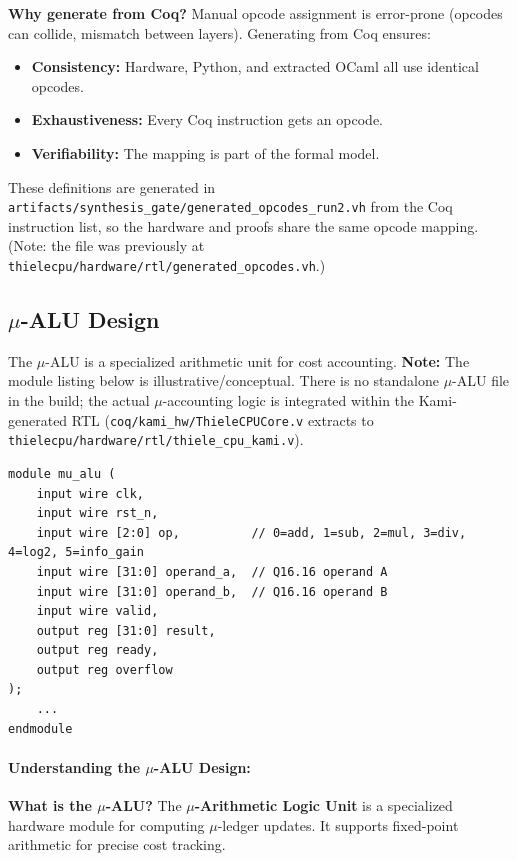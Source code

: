 \textbf{Why generate from Coq?} Manual opcode assignment is error-prone (opcodes can collide, mismatch between layers). Generating from Coq ensures:
\begin{itemize}
    \item \textbf{Consistency:} Hardware, Python, and extracted OCaml all use identical opcodes.
    \item \textbf{Exhaustiveness:} Every Coq instruction gets an opcode.
    \item \textbf{Verifiability:} The mapping is part of the formal model.
\end{itemize}


These definitions are generated in \texttt{artifacts/synthesis\_gate/generated\_opcodes\_run2.vh} from the Coq instruction list, so the hardware and proofs share the same opcode mapping. (Note: the file was previously at \texttt{thielecpu/hardware/rtl/generated\_opcodes.vh}.)

\subsection{$\mu$-ALU Design}

The $\mu$-ALU is a specialized arithmetic unit for cost accounting. \textbf{Note:} The module listing below is illustrative/conceptual. There is no standalone $\mu$-ALU file in the build; the actual $\mu$-accounting logic is integrated within the Kami-generated RTL (\texttt{coq/kami\_hw/ThieleCPUCore.v} extracts to \texttt{thielecpu/hardware/rtl/thiele\_cpu\_kami.v}).
\begin{lstlisting}
module mu_alu (
    input wire clk,
    input wire rst_n,
    input wire [2:0] op,          // 0=add, 1=sub, 2=mul, 3=div, 4=log2, 5=info_gain
    input wire [31:0] operand_a,  // Q16.16 operand A
    input wire [31:0] operand_b,  // Q16.16 operand B
    input wire valid,
    output reg [31:0] result,
    output reg ready,
    output reg overflow
);
    ...
endmodule
\end{lstlisting}

\paragraph{Understanding the $\mu$-ALU Design:}

\textbf{What is the $\mu$-ALU?} The \textbf{$\mu$-Arithmetic Logic Unit} is a specialized hardware module for computing $\mu$-ledger updates. It supports fixed-point arithmetic for precise cost tracking.

